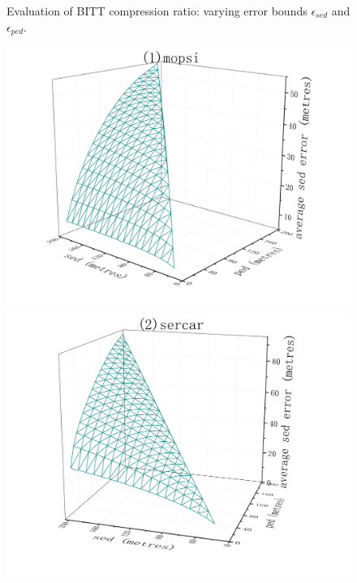 {\begin{figure}[tb!]
	\vspace{-2ex}
	\caption{\small Evaluation of BITT compression ratio: varying error bounds $\epsilon_{sed}$ and $\epsilon_{ped}$.}
	\label{fig:bitt-compression-ratio}
	\vspace{-1ex}
\end{figure}


\begin{figure}[tb!]
	\centering
	\includegraphics[scale = 0.210]{figures/Fig-BITT-mopsi-sed-error.png}\hspace{1ex}
	\includegraphics[scale = 0.210]{figures/Fig-BITT-sercar-sed-error.png}\hspace{1ex}

\end{figure}}
